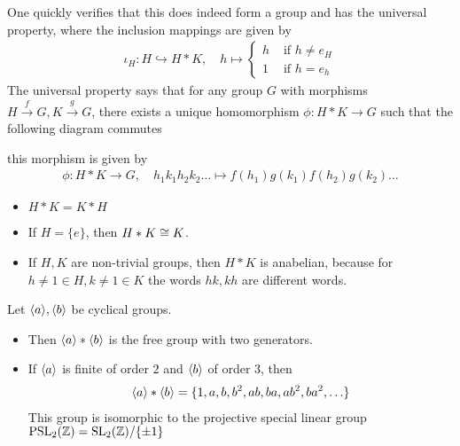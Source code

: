 One quickly verifies that this does indeed form a group and has the universal property, where the inclusion mappings are given by
\begin{align*}
  \iota_H: H \hookrightarrow H \ast K, 
  \quad h \mapsto  \left\{\begin{array}{ll}
    h & \text{ if } h \neq e_H\\
    1 & \text{ if } h = e_h
  \end{array} \right.
\end{align*}
The universal property says that for any group $G$ with morphisms $H \stackrel{f}{\to} G, K \stackrel{g}{\to}G$, there exists a unique homomorphism $\phi: H \ast K \to G$ such that the following diagram commutes
\begin{center}
\end{center}
this morphism is given by
\begin{align*}
  \phi: H \ast K \to G, \quad h_1 k_1h_2k_2 \ldots \mapsto f(h_1)g(k_1)f(h_2)g(k_2)\ldots
\end{align*}


\begin{itemize}
  \item $H \ast K = K \ast H$
  \item If $H = \{e\}$, then $H \ast K \cong K$.
  \item If $H,K$ are non-trivial groups, then $H \ast K$ is anabelian, because for $h \neq 1 \in H, k \neq 1 \in K$ the words $hk, kh$ are different words.
\end{itemize}

\begin{ex}[]
  Let $\langle a\rangle, \langle b\rangle$ be cyclical groups. 

  \begin{itemize}
    \item Then $\langle a\rangle \ast \langle b\rangle$ is the free group with two generators. 
    \item If $\langle a\rangle$ is finite of order $2$ and $\langle b\rangle$ of order $3$, then 
      \begin{align*}
        \langle a\rangle \ast \langle b\rangle = \{1,a,b,b^{2},ab,ba,ab^{2},ba^{2}, \ldots\}
      \end{align*}
      This group is isomorphic to the projective special linear group $\text{PSL}_2(\mathbb{Z}) = \text{SL}_2(\mathbb{Z})/\{\pm 1\}$
  \end{itemize}
\end{ex}


